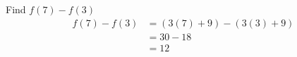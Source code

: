 \documentclass{exam}
\begin{document}
\begin{questions}
\begin{answers}{2}
        \answer Find \(f(7) - f(3)\)
        \[
            \begin{aligned}
                f(7) - f(3) &= (3(7) + 9) - (3(3) + 9)\\
                &= 30 - 18\\
                &= 12\\
            \end{aligned} 
        \]
    \end{answers}

\end{questions}
\end{document}
